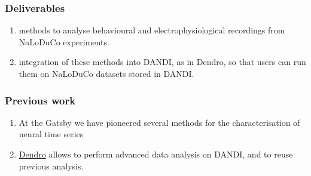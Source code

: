 
\begin{frame}
    \frametitle{Deliverables}

    \begin{enumerate}

        \item methods to analyse behavioural and electrophysiological
            recordings from NaLoDuCo experiments.

        \item integration of these methods into DANDI, as in Dendro, so that users
        can run them on NaLoDuCo datasets stored in DANDI.

    \end{enumerate}

\end{frame}

\begin{frame}
    \frametitle{Previous work}

    \begin{enumerate}

		\item At the Gatsby we have pioneered several methods for the
		characterisation of neural time
		series~\citep[e.g.,][]{yuEtAl09,dunckerAndSahani18,ruttenEtAl20,yuEtAl24,buesingEtAl12a,buesingEtAl12b,mackeEtAl15,soulatEtAl21,walkerEtAl23,turnerAndSahani14,osheaEtAl22,pachitariuEtAl13a,pachitariuEtAl13b}

        \item \href{https://github.com/magland/dendro}{Dendro} allows to
            perform advanced data analysis on DANDI, and to reuse previous
            analysis.

    \end{enumerate}

\end{frame}

